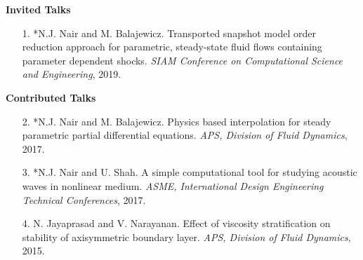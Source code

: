 \documentclass[margin]{res}
\begin{document}
\begin{resume}
\textbf{Invited Talks}

\begin{itemize} 
 \item[1. ] *N.J. Nair and M. Balajewicz. Transported snapshot model order reduction approach for parametric, steady-state fluid flows containing parameter dependent shocks. \textit{SIAM Conference on Computational Science and Engineering}, 2019.
\end{itemize}

\textbf{Contributed Talks} 
\begin{itemize}
 \item[2.] *N.J. Nair and M. Balajewicz. Physics based interpolation for steady parametric partial differential equations. \textit{APS, Division of Fluid Dynamics}, 2017.
 
 \item[3.] *N.J. Nair and U. Shah. A simple computational tool for studying acoustic waves in nonlinear medium. \textit{ASME, International Design Engineering Technical Conferences}, 2017.
 
 \item[4.] N. Jayaprasad and V. Narayanan. Effect of viscosity stratification on stability of axisymmetric boundary layer. \textit{APS, Division of Fluid Dynamics}, 2015.
  
\end{itemize}
		 
%
%
		 

\end{resume}
\end{document}
